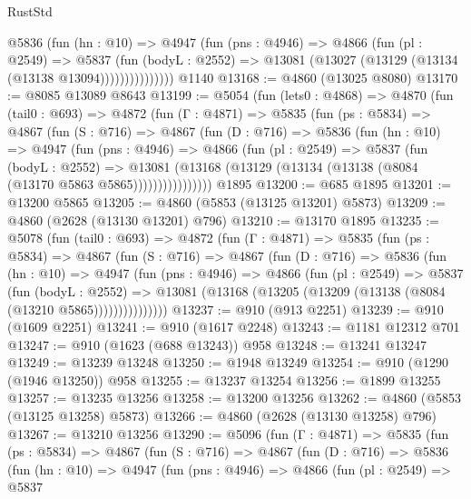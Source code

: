 \begin{lexlean}{RustStd}
\begin{coremodule}
                @5836
                  (fun (hn : @10) =>
                  @4947
                    (fun (pns : @4946) =>
                    @4866
                      (fun (pl : @2549) =>
                      @5837
                        (fun (bodyL : @2552) =>
                        @13081 (@13027 (@13129 (@13134 (@13138 @13094)))))))))))))))
    @1140
@13168 := @4860 (@13025 @8080)
@13170 := @8085 @13089 @8643
@13199 := @5054
    (fun (lets0 : @4868) =>
    @4870
      (fun (tail0 : @693) =>
      @4872
        (fun (Γ : @4871) =>
        @5835
          (fun (ps : @5834) =>
          @4867
            (fun (S : @716) =>
            @4867
              (fun (D : @716) =>
              @5836
                (fun (hn : @10) =>
                @4947
                  (fun (pns : @4946) =>
                  @4866
                    (fun (pl : @2549) =>
                    @5837
                      (fun (bodyL : @2552) =>
                      @13081
                        (@13168 (@13129 (@13134 (@13138 (@8084 (@13170 @5863 @5865))))))))))))))))
    @1895
@13200 := @685 @1895
@13201 := @13200 @5865
@13205 := @4860 (@5853 (@13125 @13201) @5873)
@13209 := @4860 (@2628 (@13130 @13201) @796)
@13210 := @13170 @1895
@13235 := @5078
    (fun (tail0 : @693) =>
    @4872
      (fun (Γ : @4871) =>
      @5835
        (fun (ps : @5834) =>
        @4867
          (fun (S : @716) =>
          @4867
            (fun (D : @716) =>
            @5836
              (fun (hn : @10) =>
              @4947
                (fun (pns : @4946) =>
                @4866
                  (fun (pl : @2549) =>
                  @5837
                    (fun (bodyL : @2552) =>
                    @13081 (@13168 (@13205 (@13209 (@13138 (@8084 (@13210 @5865)))))))))))))))
@13237 := @910 (@913 @2251)
@13239 := @910 (@1609 @2251)
@13241 := @910 (@1617 @2248)
@13243 := @1181 @12312 @701
@13247 := @910 (@1623 (@688 @13243)) @958
@13248 := @13241 @13247
@13249 := @13239 @13248
@13250 := @1948 @13249
@13254 := @910 (@1290 (@1946 @13250)) @958
@13255 := @13237 @13254
@13256 := @1899 @13255
@13257 := @13235 @13256
@13258 := @13200 @13256
@13262 := @4860 (@5853 (@13125 @13258) @5873)
@13266 := @4860 (@2628 (@13130 @13258) @796)
@13267 := @13210 @13256
@13290 := @5096
    (fun (Γ : @4871) =>
    @5835
      (fun (ps : @5834) =>
      @4867
        (fun (S : @716) =>
        @4867
          (fun (D : @716) =>
          @5836
            (fun (hn : @10) =>
            @4947
              (fun (pns : @4946) =>
              @4866
                (fun (pl : @2549) =>
                @5837

\end{coremodule}
\end{lexlean}

